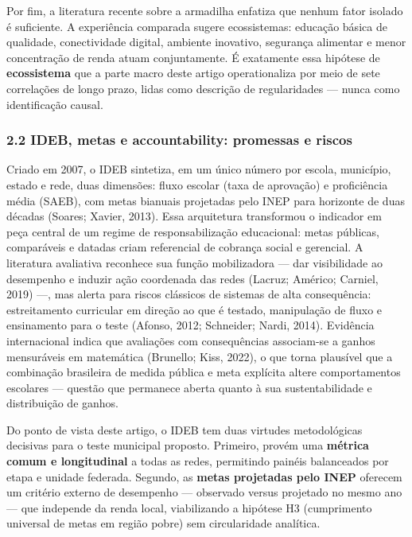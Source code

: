 \documentclass[
  brazilian,
  12pt,
  a4paper,
]{article}
\begin{document}
Por fim, a literatura recente sobre a armadilha enfatiza que nenhum
fator isolado é suficiente. A experiência comparada sugere ecossistemas:
educação básica de qualidade, conectividade digital, ambiente inovativo,
segurança alimentar e menor concentração de renda atuam conjuntamente. É
exatamente essa hipótese de \textbf{ecossistema} que a parte macro deste
artigo operationaliza por meio de sete correlações de longo prazo, lidas
como descrição de regularidades --- nunca como identificação causal.

\subsubsection{2.2 IDEB, metas e accountability: promessas e
riscos}\label{ideb-metas-e-accountability-promessas-e-riscos}

Criado em 2007, o IDEB sintetiza, em um único número por escola,
município, estado e rede, duas dimensões: fluxo escolar (taxa de
aprovação) e proficiência média (SAEB), com metas bianuais projetadas
pelo INEP para horizonte de duas décadas (Soares; Xavier, 2013). Essa
arquitetura transformou o indicador em peça central de um regime de
responsabilização educacional: metas públicas, comparáveis e datadas
criam referencial de cobrança social e gerencial. A literatura
avaliativa reconhece sua função mobilizadora --- dar visibilidade ao
desempenho e induzir ação coordenada das redes (Lacruz; Américo;
Carniel, 2019) ---, mas alerta para riscos clássicos de sistemas de alta
consequência: estreitamento curricular em direção ao que é testado,
manipulação de fluxo e ensinamento para o teste (Afonso, 2012;
Schneider; Nardi, 2014). Evidência internacional indica que avaliações
com consequências associam-se a ganhos mensuráveis em matemática
(Brunello; Kiss, 2022), o que torna plausível que a combinação
brasileira de medida pública e meta explícita altere comportamentos
escolares --- questão que permanece aberta quanto à sua sustentabilidade
e distribuição de ganhos.

Do ponto de vista deste artigo, o IDEB tem duas virtudes metodológicas
decisivas para o teste municipal proposto. Primeiro, provém uma
\textbf{métrica comum e longitudinal} a todas as redes, permitindo
painéis balanceados por etapa e unidade federada. Segundo, as
\textbf{metas projetadas pelo INEP} oferecem um critério externo de
desempenho --- observado versus projetado no mesmo ano --- que independe
da renda local, viabilizando a hipótese H3 (cumprimento universal de
metas em região pobre) sem circularidade analítica.
\end{document}
